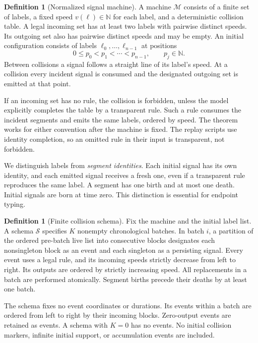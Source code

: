 \documentclass[11pt,letterpaper]{article}
\numberwithin{equation}{section}
\theoremstyle{definition}
\newtheorem{definition}[theorem]{Definition}
\theoremstyle{remark}
\newcommand{\NN}{\mathbb N}
\newcommand{\cS}{\mathcal S}
\newcommand{\cM}{\mathcal M}
\begin{document}
\begin{definition}[Normalized signal machine]
A machine $\cM$ consists of a finite set of labels, a fixed speed $v(\ell)\in\NN$ for each label, and a deterministic collision table. A legal incoming set has at least two labels with pairwise distinct speeds. Its outgoing set also has pairwise distinct speeds and may be empty. An initial configuration consists of labels $\ell_0,\ldots,\ell_{n-1}$ at positions
\[
 0\le p_0<p_1<\cdots<p_{n-1},\qquad p_j\in\NN.
\]
Between collisions a signal follows a straight line of its label's speed. At a collision every incident signal is consumed and the designated outgoing set is emitted at that point.
\end{definition}

If an incoming set has no rule, the collision is forbidden, unless the model explicitly completes the table by a transparent rule. Such a rule consumes the incident segments and emits the same labels, ordered by speed. The theorem works for either convention after the machine is fixed. The replay scripts use identity completion, so an omitted rule in their input is transparent, not forbidden.

We distinguish labels from \emph{segment identities}. Each initial signal has its own identity, and each emitted signal receives a fresh one, even if a transparent rule reproduces the same label. A segment has one birth and at most one death. Initial signals are born at time zero. This distinction is essential for endpoint typing.

\begin{definition}[Finite collision schema]
Fix the machine and the initial label list. A schema $\cS$ specifies $K$ nonempty chronological batches. In batch $i$, a partition of the ordered pre-batch live list into consecutive blocks designates each nonsingleton block as an event and each singleton as a persisting signal. Every event uses a legal rule, and its incoming speeds strictly decrease from left to right. Its outputs are ordered by strictly increasing speed. All replacements in a batch are performed atomically. Segment births precede their deaths by at least one batch.
\end{definition}

The schema fixes no event coordinates or durations. Its events within a batch are ordered from left to right by their incoming blocks. Zero-output events are retained as events. A schema with $K=0$ has no events. No initial collision markers, infinite initial support, or accumulation events are included.
\end{document}

